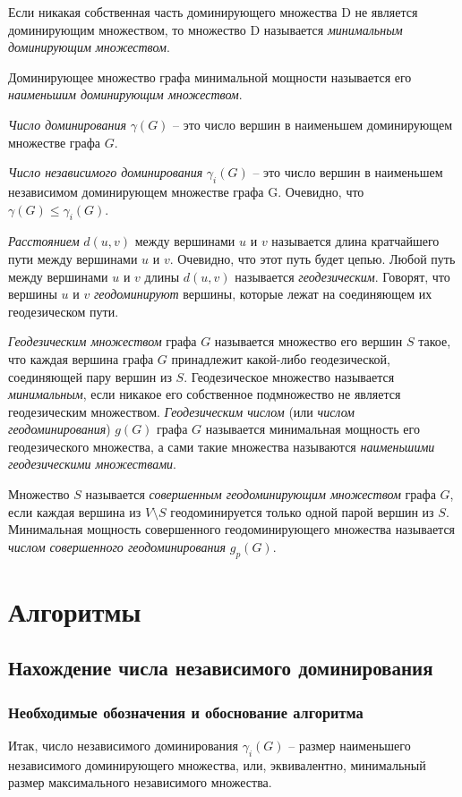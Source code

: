 \documentclass[bachelor, och, nir]{SCWorks}
\begin{document}
Если никакая собственная часть доминирующего множества D не
является доминирующим множеством, то множество D называется
\textit{минимальным доминирующим множеством}. 

Доминирующее множество графа минимальной мощности называется
его \textit{наименьшим доминирующим множеством}.

\textit{Число доминирования}
$\gamma(G)$ -- это число вершин в наименьшем
доминирующем множестве графа $G$. 

\textit{Число независимого доминирования} $\gamma_i(G)$ -- это число вершин в
наименьшем независимом доминирующем множестве графа G. Очевидно, 
что $\gamma(G) \leq \gamma_i(G)$.

\textit{Расстоянием} $d(u, v)$ между вершинами $u$ и $v$ называется длина
кратчайшего пути между вершинами $u$ и $v$. Очевидно, что этот путь будет
цепью. Любой путь между вершинами $u$ и $v$ длины $d(u, v)$ называется
\textit{геодезическим}. Говорят, что вершины $u$ и $v$ \textit{геодоминируют} вершины, 
которые лежат на соединяющем их геодезическом пути.

\textit{Геодезическим множеством} графа $G$ называется множество его вершин $S$ такое, 
что каждая вершина графа $G$ принадлежит какой-либо геодезической, соединяющей пару вершин из $S$. 
Геодезическое множество называется \textit{минимальным}, если никакое его собственное подмножество не
является геодезическим множеством. \textit{Геодезическим числом} (или \textit{числом геодоминирования}) $g(G)$ графа $G$
называется минимальная мощность его геодезического множества, а сами
такие множества называются \textit{наименьшими геодезическими множествами}. 

Множество $S$ называется \textit{совершенным геодоминирующим
множеством} графа $G$, если каждая вершина из $V \setminus S$ геодоминируется
только одной парой вершин из $S$. Минимальная мощность совершенного
геодоминирующего множества называется \textit{числом совершенного
геодоминирования} $g_p(G)$. 

\section{Алгоритмы} 
\subsection{Нахождение числа независимого доминирования}
\subsubsection{Необходимые обозначения и обоснование алгоритма}
Итак, число независимого доминирования $\gamma_i(G)$ -- размер наименьшего независимого доминирующего множества,
или, эквивалентно, минимальный размер максимального независимого множества.
\end{document}
